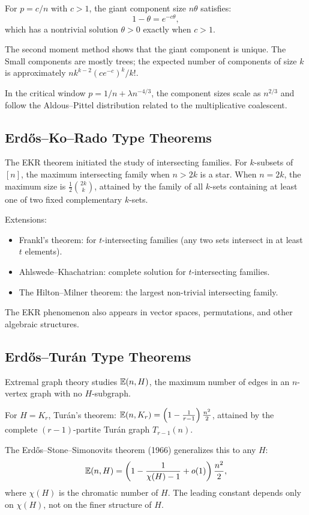 For $p = c/n$ with $c > 1$, the giant component size $n\theta$ satisfies:
\[
1 - \theta = e^{-c\theta},
\]
which has a nontrivial solution $\theta > 0$ exactly when $c > 1$.

The second moment method shows that the giant component is unique. The Small components are mostly trees; the expected number of components of size $k$ is approximately $n k^{k-2} (ce^{-c})^k / k!$.

In the critical window $p = 1/n + \lambda n^{-4/3}$, the component sizes scale as $n^{2/3}$ and follow the Aldous--Pittel distribution related to the multiplicative coalescent.

\subsection{Erd\H{o}s--Ko--Rado Type Theorems}

The EKR theorem initiated the study of intersecting families. For $k$-subsets of $[n]$, the maximum intersecting family when $n > 2k$ is a star. When $n = 2k$, the maximum size is $\frac{1}{2}\binom{2k}{k}$, attained by the family of all $k$-sets containing at least one of two fixed complementary $k$-sets.

Extensions:
\begin{itemize}
    \item Frankl's theorem: for $t$-intersecting families (any two sets intersect in at least $t$ elements).
    \item Ahlswede--Khachatrian: complete solution for $t$-intersecting families.
    \item The Hilton--Milner theorem: the largest non-trivial intersecting family.
\end{itemize}

The EKR phenomenon also appears in vector spaces, permutations, and other algebraic structures.

\subsection{Erd\H{o}s--Tur\'{a}n Type Theorems}

Extremal graph theory studies $\mathbb{E}(n, H)$, the maximum number of edges in an $n$-vertex graph with no $H$-subgraph.

For $H = K_r$, Tur\'{a}n's theorem: $\mathbb{E}(n, K_r) = \left(1 - \frac{1}{r-1}\right) \frac{n^2}{2}$, attained by the complete $(r-1)$-partite Tur\'{a}n graph $T_{r-1}(n)$.

The Erd\H{o}s--Stone--Simonovits theorem (1966) generalizes this to any $H$:
\[
\mathbb{E}(n, H) = \left(1 - \frac{1}{\chi(H) - 1} + o(1)\right) \frac{n^2}{2},
\]
where $\chi(H)$ is the chromatic number of $H$. The leading constant depends only on $\chi(H)$, not on the finer structure of $H$.

